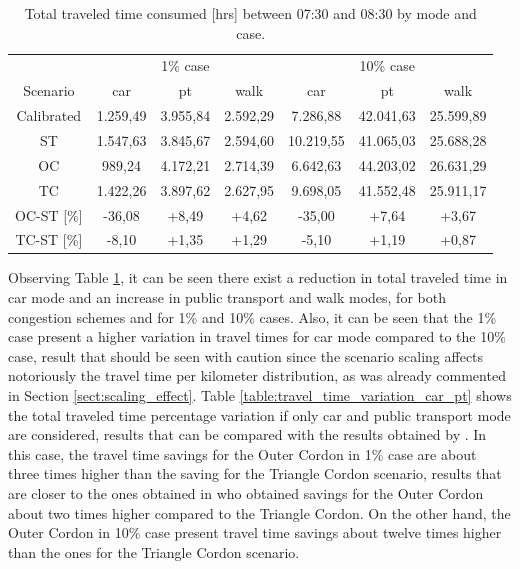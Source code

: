 \documentclass[Journal,letterpaper]{ascelike-new}
\begin{document}
\begin{table}[h!]
	\centering
	\caption{Total traveled time consumed [hrs] between 07:30 and 08:30 by mode and case.}
	\label{table:travel_time_variation}
	\begin{tabular}{c|ccc|ccc}
		\cline{1-7}
				    & \multicolumn{3}{c|}{1\% case} & \multicolumn{3}{c}{10\% case} \\
		Scenario	& car    & pt    & walk  & car     & pt    & walk   \\ 
		\cline{1-7}
		Calibrated	& 1.259,49 	& 3.955,84	& 2.592,29	& 7.286,88	& 42.041,63 & 25.599,89  \\
		ST		 	& 1.547,63 	& 3.845,67	& 2.594,60	& 10.219,55	& 41.065,03 & 25.688,28  \\
		OC		 	& 989,24 	& 4.172,21 	& 2.714,39	& 6.642,63	& 44.203,02 & 26.631,29  \\
		TC		 	& 1.422,26 	& 3.897,62	& 2.627,95	& 9.698,05	& 41.552,48 & 25.911,17  \\
		\hline
		OC-ST [\%] 	& -36,08 & +8,49 & +4,62 & -35,00 & +7,64 & +3,67 \\		
		TC-ST [\%] 	& -8,10  & +1,35 & +1,29 & -5,10  & +1,19 & +0,87 \\					
		\cline{1-7} 
	\end{tabular}
\end{table}

Observing Table \ref{table:travel_time_variation}, it can be seen there exist a reduction in total traveled time in car mode and an increase in public transport and walk modes, for both congestion schemes and for 1\% and 10\% cases. Also, it can be seen that the 1\% case present a higher variation in travel times for car mode compared to the 10\% case, result that should be seen with caution since the scenario scaling affects notoriously the travel time per kilometer distribution, as was already commented in Section \ref{sect:scaling_effect}. Table \ref{table:travel_time_variation_car_pt} shows the total traveled time percentage variation if only car and public transport mode are considered, results that can be compared with the results obtained by \cite{gleave2009tarificacion}. In this case, the travel time savings for the Outer Cordon in 1\% case are about three times higher than the saving for the Triangle Cordon scenario, results that are closer to the ones obtained in \cite{gleave2009tarificacion} who obtained savings for the Outer Cordon about two times higher compared to the Triangle Cordon. On the other hand, the Outer Cordon in 10\% case present travel time savings about twelve times higher than the ones for the Triangle Cordon scenario. 
\end{document}
